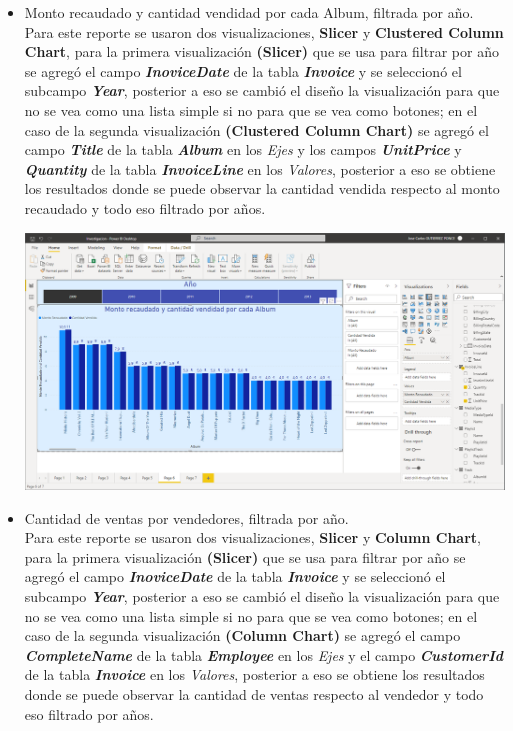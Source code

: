 \documentclass{article}
\begin{document}
\begin{enumerate}[\tab 1.]
\begin{itemize}
            \item Monto recaudado y cantidad vendidad por cada Album, filtrada por año.\\[0.1in]
            Para este reporte se usaron dos visualizaciones, \textbf{Slicer} y \textbf{Clustered Column Chart}, para la primera visualización \textbf{(Slicer)} que se usa para filtrar por año se agregó el campo \textit{\textbf{InoviceDate}} de la tabla \textit{\textbf{Invoice}} y se seleccionó el subcampo \textit{\textbf{Year}}, posterior a eso se cambió el diseño la visualización para que no se vea como una lista simple si no para que se vea como botones; en el caso de la segunda visualización \textbf{(Clustered Column Chart)} se agregó el campo \textit{\textbf{Title}} de la tabla \textit{\textbf{Album}} en los \textit{Ejes} y los campos \textit{\textbf{UnitPrice}} y \textit{\textbf{Quantity}} de la tabla \textit{\textbf{InvoiceLine}} en los \textit{Valores}, posterior a eso se obtiene los resultados donde se puede observar la cantidad vendida respecto al monto recaudado y todo eso filtrado por años.
            \begin{center}
                \includegraphics[width=13cm]{./images/23.3.png}
            \end{center}
            \newpage
            \item Cantidad de ventas por vendedores, filtrada por año.\\[0.1in]
            Para este reporte se usaron dos visualizaciones, \textbf{Slicer} y \textbf{Column Chart}, para la primera visualización \textbf{(Slicer)} que se usa para filtrar por año se agregó el campo \textit{\textbf{InoviceDate}} de la tabla \textit{\textbf{Invoice}} y se seleccionó el subcampo \textit{\textbf{Year}}, posterior a eso se cambió el diseño la visualización para que no se vea como una lista simple si no para que se vea como botones; en el caso de la segunda visualización \textbf{(Column Chart)} se agregó el campo \textit{\textbf{CompleteName}} de la tabla \textit{\textbf{Employee}} en los \textit{Ejes} y el campo \textit{\textbf{CustomerId}} de la tabla \textit{\textbf{Invoice}} en los \textit{Valores}, posterior a eso se obtiene los resultados donde se puede observar la cantidad de ventas respecto al vendedor y todo eso filtrado por años.

\end{itemize}
\end{enumerate}
\end{document}
